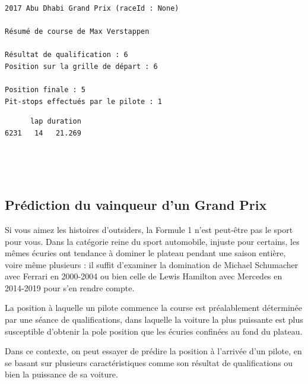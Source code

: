 \documentclass[11pt]{article}
\begin{document}
    \begin{Verbatim}[commandchars=\\\{\}]
2017 Abu Dhabi Grand Prix (raceId : None)

Résumé de course de Max Verstappen

Résultat de qualification : 6
Position sur la grille de départ : 6

Position finale : 5
Pit-stops effectués par le pilote : 1
    \end{Verbatim}

    
    \begin{verbatim}
      lap duration
6231   14   21.269
    \end{verbatim}

    
    \begin{center}
    \end{center}
    { \hspace*{\fill} \\}
    
    \begin{center}
    \end{center}
    { \hspace*{\fill} \\}
    
    \hypertarget{pruxe9diction-du-vainqueur-dun-grand-prix}{%
\subsection{Prédiction du vainqueur d'un Grand
Prix}\label{pruxe9diction-du-vainqueur-dun-grand-prix}}

Si vous aimez les histoires d'outsiders, la Formule 1 n'est peut-être
pas le sport pour vous. Dans la catégorie reine du sport automobile,
injuste pour certains, les mêmes écuries ont tendance à dominer le
plateau pendant une saison entière, voire même plusieurs : il suffit
d'examiner la domination de Michael Schumacher avec Ferrari en 2000-2004
ou bien celle de Lewis Hamilton avec Mercedes en 2014-2019 pour s'en
rendre compte.

La position à laquelle un pilote commence la course est préalablement
déterminée par une séance de qualifications, dans laquelle la voiture la
plus puissante est plus susceptible d'obtenir la pole position que les
écuries confinées au fond du plateau.

Dans ce contexte, on peut essayer de prédire la position à l'arrivée
d'un pilote, en se basant sur plusieurs caractéristiques comme son
résultat de qualifications ou bien la puissance de sa voiture.
\end{document}
